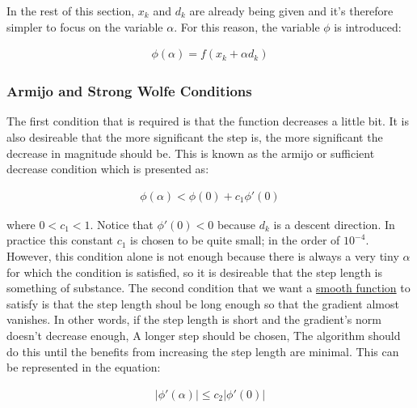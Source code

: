 In the rest of this section, $x_k$ and $d_k$ are already being given and it's therefore simpler to focus on the variable $\alpha$.  For this reason, the variable $\phi$ is introduced:

\begin{equation}
  \begin{aligned}
    \phi(\alpha) = f(x_k + \alpha d_k)
  \end{aligned}
\end{equation}

\subsubsection{Armijo and Strong Wolfe Conditions}

The first condition that is required is that the function decreases a little bit.  It is also desireable that the more significant the step is, the more significant the decrease in magnitude should be.  This is known as the armijo or sufficient decrease condition which is presented as:

\begin{equation} \label{armijo}
  \begin{aligned}
    \phi (\alpha) < \phi(0) + c_1 \phi'(0)
  \end{aligned}
\end{equation}

where $0  < c_1 < 1$.  Notice that $\phi'(0) < 0$ because $d_k$ is a descent direction.  In practice this constant $c_1$ is chosen to be quite small;  in the order of $10^{-4}$.  However, this condition alone is not enough because there is always a very tiny $\alpha$ for which the condition is satisfied,  so it is desireable that the step length is something of substance.  The second condition that we want a \underline{smooth function} to satisfy is that the step length shoul be long enough so that the gradient almost vanishes.  In other words, if the step length is short and the gradient's norm doesn't decrease enough, A longer step should be chosen,  The algorithm should do this until the benefits from increasing the step length are minimal.  This can be represented in the equation:

\begin{equation} \label{strongWolfe}
  \begin{aligned}
    |\phi'(\alpha)| \leq c_2|\phi'(0)| 
  \end{aligned}
\end{equation}

